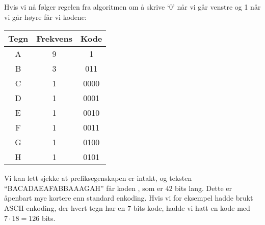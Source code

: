 \begin{example}
			Hvis vi nå følger regelen fra algoritmen om å skrive `0' når vi går venstre og 1 når vi går høyre får vi kodene:
			\begin{center}
				\begin{tabular}{c c c}
					Tegn & Frekvens & Kode \\
					\hline
					A & 9 & 1\\
					B & 3 & 011\\
					C & 1 & 0000\\
					D & 1 & 0001\\
					E & 1 & 0010\\
					F & 1 & 0011\\
					G & 1 & 0100\\
					H & 1 & 0101
				\end{tabular}
			\end{center}
			Vi kan lett sjekke at prefiksegenskapen er intakt, og teksten ``BACADAEAFABBAAAGAH'' får koden , som er $ 42 $ bits lang. Dette er åpenbart mye kortere enn standard enkoding. Hvis vi for eksempel hadde brukt ASCII-enkoding, der hvert tegn har en $ 7 $-bits kode, hadde vi hatt en kode med $7\cdot18 = 126$ bits.
			\end{example}